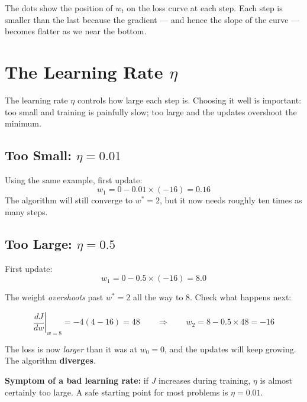 \documentclass[12pt, a4paper]{article}
\newif\ifstudentmode
\newcommand{\sol}[2][6cm]{%
  \ifstudentmode
    \underline{\hspace{#1}}%
  \else
    {#2}%
  \fi
}
\theoremstyle{definition}
\begin{document}
The dots show the position of $w_t$ on the loss curve at each step.
Each step is smaller than the last because the gradient --- and hence the
slope of the curve --- becomes flatter as we near the bottom.

\section{The Learning Rate $\eta$}

The learning rate $\eta$ controls how large each step is.
Choosing it well is important: too small and training is painfully slow;
too large and the updates overshoot the minimum.

\subsection*{Too Small: $\eta = 0.01$}

Using the same example, first update:
\[
  w_1 = 0 - 0.01 \times (-16) = \sol[2cm]{0.16}
\]
The algorithm will still converge to $w^* = 2$, but it now needs roughly
ten times as many steps.

\subsection*{Too Large: $\eta = 0.5$}

First update:
\[
  w_1 = 0 - 0.5 \times (-16) = \sol[2cm]{8.0}
\]

The weight \emph{overshoots} past $w^* = 2$ all the way to $8$.
Check what happens next:

\[
  \left.\frac{dJ}{dw}\right|_{w=8}
  = -4(4 - 16) = \sol[2.5cm]{48}
  \qquad\Rightarrow\qquad
  w_2 = 8 - 0.5 \times 48 = \sol[2cm]{-16}
\]

The loss is now \emph{larger} than it was at $w_0 = 0$, and the updates
will keep growing.  The algorithm \textbf{diverges}.

\begin{warnbox}
\textbf{Symptom of a bad learning rate:} if $J$ increases during training,
$\eta$ is almost certainly too large.  A safe starting point for most
problems is $\eta = 0.01$.
\end{warnbox}

\end{document}
